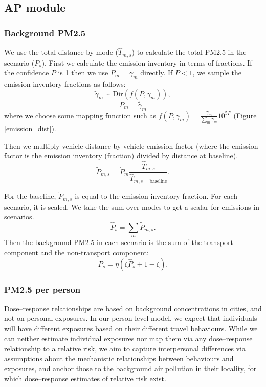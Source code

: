 \documentclass{article}
\begin{document}
\subsection{AP module}

\subsubsection{Background PM2.5}\label{dir}

We use the total distance by mode ($\hat{T}_{m,s}$) to calculate the total PM2.5 in the scenario ($\bar{P}_s$). First we calculate the emission inventory in terms of fractions. If  the confidence $P$ is 1 then we use $\dot{P}_{m}=\gamma_m$ directly. If $P<1$, we sample the emission inventory fractions as follows:
$$\tilde{\gamma}_m \sim \text{Dir}(f(P,\gamma_m)),$$
$$\dot{P}_m=\tilde{\gamma}_m$$
where we choose some mapping function such as $f(P,\gamma_m)=\frac{\gamma_m}{\sum_m\gamma_m}10^{5P}$ (Figure \ref{emission_dist}).

Then we multiply vehicle distance by vehicle emission factor (where the emission factor is the emission inventory (fraction) divided by distance at baseline).
$$\tilde{P}_{m,s}=\dot{P}_m\frac{\hat{T}_{m,s}}{\hat{T}_{m,s=\text{baseline}}}.$$

For the baseline, $\tilde{P}_{m,s}$ is equal to the emission inventory fraction. For each scenario, it is scaled. We take the sum over modes to get a scalar for emissions in scenarios.
$$\hat{P}_{s}=\sum_{m} \tilde{P}_{m,s}.$$
Then the background PM2.5 in each scenario is the sum of the transport component and the non-transport component:
$$\bar{P}_s=\eta(\zeta\hat{P}_s + 1-\zeta).$$

\subsubsection{PM2.5 per person}

Dose--response relationships are based on background concentrations in cities, and not on personal exposures. In our person-level model, we expect that individuals will have different exposures based on their different travel behaviours. While we can neither estimate individual exposures nor map them via any dose--response relationship to a relative risk, we aim to capture interpersonal differences via assumptions about the mechanistic relationships between behaviours and exposures, and anchor those to the background air pollution in their locality, for which dose--response estimates of relative risk exist. 
\end{document}
